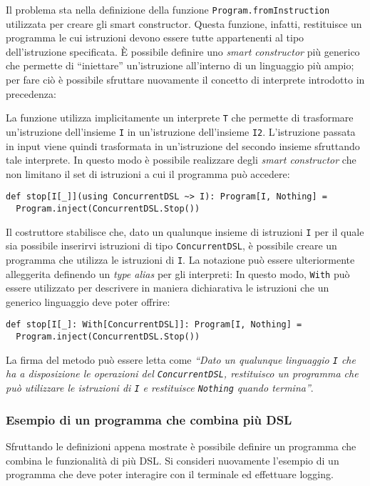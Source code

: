 Il problema sta nella definizione della funzione \lstinline{Program.fromInstruction} utilizzata per creare gli smart constructor. Questa funzione, infatti, restituisce un programma le cui istruzioni devono essere tutte appartenenti al tipo dell'istruzione specificata. È possibile definire uno \emph{smart constructor} più generico che permette di ``iniettare'' un'istruzione all'interno di un linguaggio più ampio; per fare ciò è possibile sfruttare nuovamente il concetto di interprete introdotto in precedenza:

La funzione utilizza implicitamente un interprete \lstinline{T} che permette di trasformare un'istruzione dell'insieme \lstinline{I} in un'istruzione dell'insieme \lstinline{I2}. L'istruzione passata in input viene quindi trasformata in un'istruzione del secondo insieme sfruttando tale interprete.
In questo modo è possibile realizzare degli \emph{smart constructor} che non limitano il set di istruzioni a cui il programma può accedere:
\begin{lstlisting}[language=scala3]
def stop[I[_]](using ConcurrentDSL ~> I): Program[I, Nothing] =
  Program.inject(ConcurrentDSL.Stop())
\end{lstlisting}
Il costruttore stabilisce che, dato un qualunque insieme di istruzioni \lstinline{I} per il quale sia possibile inserirvi istruzioni di tipo \lstinline{ConcurrentDSL}, è possibile creare un programma che utilizza le istruzioni di \lstinline{I}.
La notazione può essere ulteriormente alleggerita definendo un \emph{type alias} per gli interpreti:
In questo modo, \lstinline{With} può essere utilizzato per descrivere in maniera dichiarativa le istruzioni che un generico linguaggio deve poter offrire:
\begin{lstlisting}[language=scala3]
def stop[I[_]: With[ConcurrentDSL]]: Program[I, Nothing] =
  Program.inject(ConcurrentDSL.Stop())
\end{lstlisting}
La firma del metodo può essere letta come \emph{``Dato un qualunque linguaggio \lstinline{I} che ha a disposizione le operazioni del \lstinline{ConcurrentDSL}, restituisco un programma che può utilizzare le istruzioni di \lstinline{I} e restituisce \lstinline{Nothing} quando termina''}.

\subsubsection{Esempio di un programma che combina più DSL}
Sfruttando le definizioni appena mostrate è possibile definire un programma che combina le funzionalità di più DSL. Si consideri nuovamente l'esempio di un programma che deve poter interagire con il terminale ed effettuare logging.


